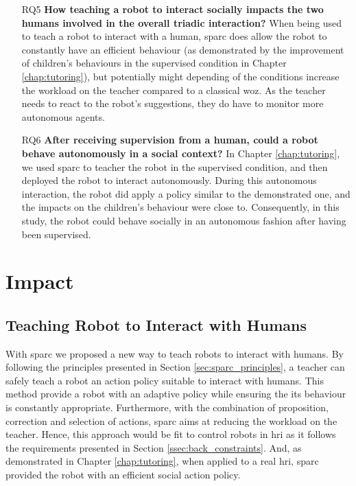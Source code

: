 \begin{itemize}
\item [RQ5] \textbf{How teaching a robot to interact socially impacts the two humans involved in the overall triadic interaction?}
When being used to teach a robot to interact with a human, \gls{sparc} does allow the robot to constantly have an efficient behaviour (as demonstrated by the improvement of children's behaviours in the supervised condition in Chapter \ref{chap:tutoring}), but potentially might depending of the conditions increase the workload on the teacher compared to a classical \gls{woz}. As the teacher needs to react to the robot's suggestions, they do have to monitor more autonomous agents.

\item [RQ6] \textbf{After receiving supervision from a human, could a robot behave autonomously in a social context?}
In Chapter \ref{chap:tutoring}, we used \gls{sparc} to teacher the robot in the supervised condition, and then deployed the robot to interact autonomously. During this autonomous interaction, the robot did apply a policy similar to the demonstrated one, and the impacts on the children's behaviour were close to. Consequently, in this study, the robot could behave socially in an autonomous fashion after having been supervised.

\end{itemize}
\section{Impact} \label{sec:disc_impact}

\subsection{Teaching Robot to Interact with Humans}

With \gls{sparc} we proposed a new way to teach robots to interact with humans. By following the principles presented in Section \ref{sec:sparc_principles}, a teacher can safely teach a robot an action policy suitable to interact with humans. This method provide a robot with an adaptive policy while ensuring the its behaviour is constantly appropriate. Furthermore, with the combination of proposition, correction and selection of actions, \gls{sparc} aims at reducing the workload on the teacher. Hence, this approach would be fit to control robots in \gls{hri} as it follows the requirements presented in Section \ref{ssec:back_constraints}. And, as demonstrated in Chapter \ref{chap:tutoring}, when applied to a real \gls{hri}, \gls{sparc} provided the robot with an efficient social action policy. 

